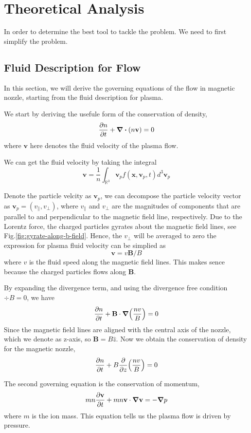 \chapter{Theoretical Analysis} \label{chap:theoretical-analysis}
In order to determine the best tool to tackle the problem. We need to first simplify the problem.

\section{Fluid Description for Flow}
In this section, we will derive the governing equations of the flow in magnetic nozzle, starting from the fluid description for plasma.

We start by deriving the usefule form of the conservation of density,
\[ \pdv{n}{t} + \div(n\mathbf{v}) = 0 \]
where $\mathbf{v}$ here denotes the fluid velocity of the plasma flow.

We can get the fluid velocity by taking the integral
\[ \mathbf{v} = \frac{1}{n}\int_{\mathbb{R}^3} \mathbf{v}_p f(\mathbf{x}, \mathbf{v}_p, t) d^3\mathbf{v}_p \]

Denote the particle velcity as $\mathbf{v}_p$, we can decompose the particle velocity vector as $\mathbf{v}_p = (v_\parallel,v_\perp)$, where $v_\parallel$ and $v_\perp$ are the magnitudes of components that are parallel to and perpendicular to the magnetic field line, respectively. Due to the Lorentz force, the charged particles gyrates about the magnetic field lines, see Fig.\ref{fig:gyrate-along-b-field}. Hence, the $v_\perp$ will be averaged to zero the expression for plasma fluid velocity can be simplied as
\[\mathbf{v} = v\mathbf{B}/B\]
where $v$ is the fluid speed along the magnetic field lines. This makes sence because the charged particles flows along $\mathbf{B}$.

By expanding the divergence term, and using the divergence free condition $\div B=0$, we have
\[ \pdv{n}{t} + \mathbf{B}\cdot \grad(\frac{nv}{B}) = 0 \]
Since the magnetic field lines are aligned with the central axis of the nozzle, which we denote as z-axis, so $\mathbf{B} = B\hat{z}$. Now we obtain the conservation of density for the magnetic nozzle,
\begin{equation}
	\pdv{n}{t} + B\pdv{z}(\frac{nv}{B}) = 0
\end{equation}

The second governing equation is the conservation of momentum,
\[ mn\pdv{\mathbf{v}}{t} + mn\mathbf{v}\cdot\grad\mathbf{v} = -\grad p \]
where $m$ is the ion mass. This equation tells us the plasma flow is driven by pressure.

